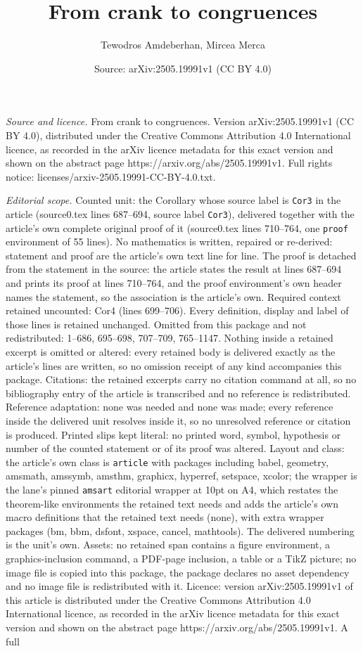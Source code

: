 \documentclass[10pt,a4paper]{amsart}
\title[From crank to congruences]{From crank to congruences}
\author{Tewodros Amdeberhan, Mircea Merca}
\date{Source: arXiv:2505.19991v1 (CC BY 4.0)}
\begin{document}
\maketitle

\noindent\emph{Source and licence.} From crank to congruences. Version arXiv:2505.19991v1 (CC BY 4.0), distributed under the Creative Commons Attribution 4.0 International licence, as recorded in the arXiv licence metadata for this exact version and shown on the abstract page https://arxiv.org/abs/2505.19991v1. Full rights notice: licenses/arxiv-2505.19991-CC-BY-4.0.txt.\par\smallskip

\noindent\textit{Editorial scope.} Counted unit: the Corollary whose source label is \texttt{Cor3} in the article (source0.tex lines 687--694, source label \texttt{Cor3}), delivered together with the article's own complete original proof of it (source0.tex lines 710--764, one \texttt{proof} environment of 55 lines). No mathematics is written, repaired or re-derived: statement and proof are the article's own text line for line. The proof is detached from the statement in the source: the article states the result at lines 687--694 and prints its proof at lines 710--764, and the proof environment's own header names the statement, so the association is the article's own. Required context retained uncounted: Cor4 (lines 699--706). Every definition, display and label of those lines is retained unchanged. Omitted from this package and not redistributed: 1--686, 695--698, 707--709, 765--1147. Nothing inside a retained excerpt is omitted or altered: every retained body is delivered exactly as the article's lines are written, so no omission receipt of any kind accompanies this package. Citations: the retained excerpts carry no citation command at all, so no bibliography entry of the article is transcribed and no reference is redistributed. Reference adaptation: none was needed and none was made; every reference inside the delivered unit resolves inside it, so no unresolved reference or citation is produced. Printed slips kept literal: no printed word, symbol, hypothesis or number of the counted statement or of its proof was altered. Layout and class: the article's own class is \texttt{article} with packages including babel, geometry, amsmath, amssymb, amsthm, graphicx, hyperref, setspace, xcolor; the wrapper is the lane's pinned \texttt{amsart} editorial wrapper at 10pt on A4, which restates the theorem-like environments the retained text needs and adds the article's own macro definitions that the retained text needs (none), with extra wrapper packages (bm, bbm, dsfont, xspace, cancel, mathtools). The delivered numbering is the unit's own. Assets: no retained span contains a figure environment, a graphics-inclusion command, a PDF-page inclusion, a table or a TikZ picture; no image file is copied into this package, the package declares no asset dependency and no image file is redistributed with it. Licence: version arXiv:2505.19991v1 of this article is distributed under the Creative Commons Attribution 4.0 International licence, as recorded in the arXiv licence metadata for this exact version and shown on the abstract page https://arxiv.org/abs/2505.19991v1. A full 
\end{document}
